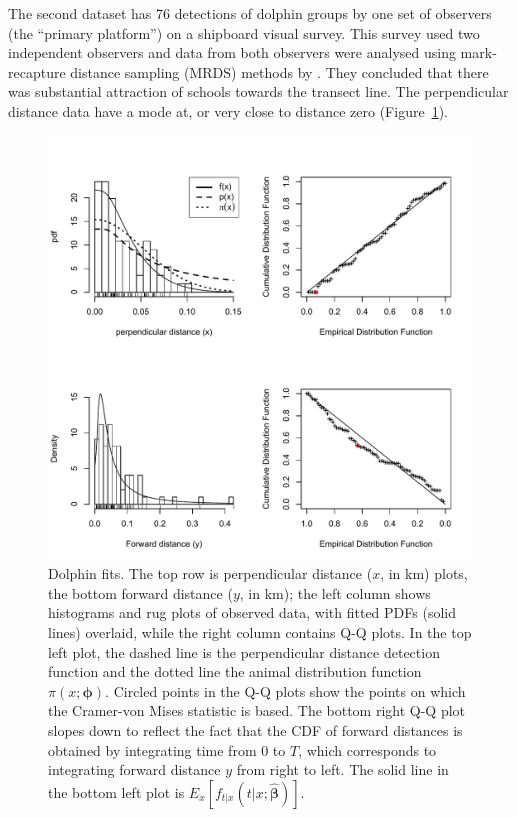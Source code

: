 \documentclass[useAMS,usenatbib,referee]{biom}
\begin{document}
The second dataset has 76 detections of dolphin groups by one set of observers (the ``primary platform'') on a shipboard visual survey. This survey used two independent observers and data from both observers were analysed using mark-recapture distance sampling (MRDS) methods \cite[see][for an overview of these methods]{Burt+al:15} by \cite{Canadas+al:04}. They concluded that there was substantial attraction of schools towards the transect line. The perpendicular distance data have a mode at, or very close to distance zero (Figure~\ref{fig:dolphin.fits}).

\begin{figure}
\caption{Dolphin fits.  The top row is perpendicular distance ($x$, in km) plots, the bottom forward distance ($y$, in km); the left column shows histograms and rug plots of observed data, with fitted PDFs (solid lines) overlaid, while the right column contains Q-Q plots. In the top left plot, the dashed line is the perpendicular distance detection function and the dotted line the animal distribution function $\pi(x;\boldsymbol{\phi})$. Circled points in the Q-Q plots show the points on which the Cramer-von Mises statistic is based. The bottom right Q-Q plot slopes down to reflect the fact that the CDF of forward distances is obtained by integrating time from 0 to $T$, which corresponds to integrating forward distance $y$ from right to left. The solid line in the bottom left plot is $E_x[f_{t|x}(t|x;\hat{\boldsymbol{\beta}})]$.\label{fig:dolphin.fits}}
\includegraphics[scale=0.6]{DolphinFits.pdf}
\end{figure}
\end{document}
